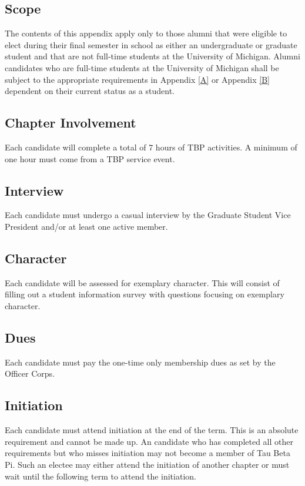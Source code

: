 \subsection{Scope} \label{C.1}

The contents of this appendix apply only to those alumni that were
eligible to elect during their final semester in school as either an undergraduate or graduate
student and that are not full-time students at the University of Michigan. Alumni
candidates who are full-time students at the University of Michigan shall be subject to the
appropriate requirements in Appendix \ref{A} or Appendix \ref{B} dependent on their current status
as a student.


\subsection{Chapter Involvement} \label{C.2}

Each candidate will complete a total of 7 hours
of TBP activities. A minimum of one hour must come from a TBP service event.


\subsection{Interview} \label{C.3}

Each candidate must undergo a casual interview by the Graduate
Student Vice President and/or at least one active member.


\subsection{Character} \label{C.4}

Each candidate will be assessed for exemplary character.
This will consist of filling out a student information survey with questions focusing on
exemplary character.


\subsection{Dues} \label{C.5}

Each candidate must pay the one-time only membership dues as set
by the Officer Corps.


\subsection{Initiation} \label{C.6}

Each candidate must attend initiation at the end of the term.
This is an absolute requirement and cannot be made up. An candidate who has completed
all other requirements but who misses initiation may not become a member of Tau Beta Pi.
Such an electee may either attend the initiation of another chapter or must wait until the
following term to attend the initiation.


